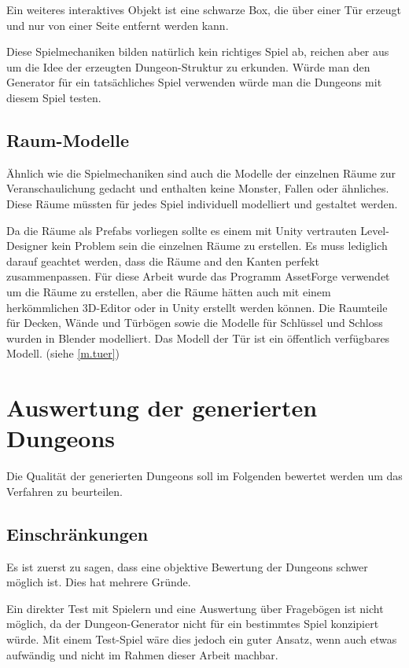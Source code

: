 Ein weiteres interaktives Objekt ist eine schwarze Box, die über einer Tür erzeugt und nur von einer Seite entfernt werden kann. 

Diese Spielmechaniken bilden natürlich kein richtiges Spiel ab, reichen aber aus um die Idee der erzeugten Dungeon-Struktur zu erkunden. Würde man den Generator für ein tatsächliches Spiel verwenden würde man die Dungeons mit diesem Spiel testen.

\section{Raum-Modelle}

Ähnlich wie die Spielmechaniken sind auch die Modelle der einzelnen Räume zur Veranschaulichung gedacht und enthalten keine Monster, Fallen oder ähnliches. Diese Räume müssten für jedes Spiel individuell modelliert und gestaltet werden. 

Da die Räume als Prefabs vorliegen sollte es einem mit Unity vertrauten Level-Designer kein Problem sein die einzelnen Räume zu erstellen. Es muss lediglich darauf geachtet werden, dass die Räume and den Kanten perfekt zusammenpassen. Für diese Arbeit wurde das Programm AssetForge verwendet um die Räume zu erstellen, aber die Räume hätten auch mit einem herkömmlichen 3D-Editor oder in Unity erstellt werden können. Die Raumteile für Decken, Wände und Türbögen sowie die Modelle für Schlüssel und Schloss wurden in Blender modelliert. Das Modell der Tür ist ein öffentlich verfügbares Modell. (siehe \ref{m.tuer})


\chapter{Auswertung der generierten Dungeons}

Die Qualität der generierten Dungeons soll im Folgenden bewertet werden um das Verfahren zu beurteilen. 

\section{Einschränkungen}

Es ist zuerst zu sagen, dass eine objektive Bewertung der Dungeons schwer möglich ist. Dies hat mehrere Gründe.

Ein direkter Test mit Spielern und eine Auswertung über Fragebögen ist nicht möglich, da der Dungeon-Generator nicht für ein bestimmtes Spiel konzipiert würde. Mit einem Test-Spiel wäre dies jedoch ein guter Ansatz, wenn auch etwas aufwändig und nicht im Rahmen dieser Arbeit machbar.


